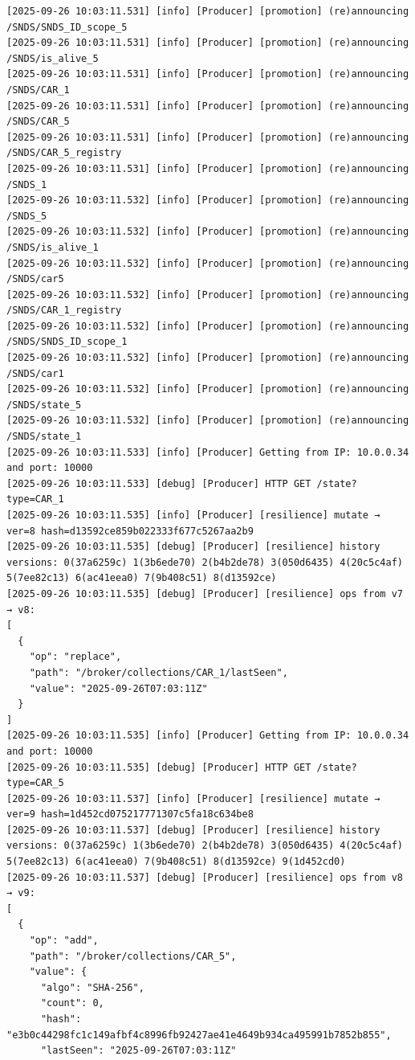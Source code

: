 \documentclass{article}
\begin{document}
\begin{lstlisting}[language=log, caption={Logs of Node F after providing the data of Node B}, label={lst:f-becoming-primary}]
[2025-09-26 10:03:11.531] [info] [Producer] [promotion] (re)announcing /SNDS/SNDS_ID_scope_5
[2025-09-26 10:03:11.531] [info] [Producer] [promotion] (re)announcing /SNDS/is_alive_5
[2025-09-26 10:03:11.531] [info] [Producer] [promotion] (re)announcing /SNDS/CAR_1
[2025-09-26 10:03:11.531] [info] [Producer] [promotion] (re)announcing /SNDS/CAR_5
[2025-09-26 10:03:11.531] [info] [Producer] [promotion] (re)announcing /SNDS/CAR_5_registry
[2025-09-26 10:03:11.531] [info] [Producer] [promotion] (re)announcing /SNDS_1
[2025-09-26 10:03:11.532] [info] [Producer] [promotion] (re)announcing /SNDS_5
[2025-09-26 10:03:11.532] [info] [Producer] [promotion] (re)announcing /SNDS/is_alive_1
[2025-09-26 10:03:11.532] [info] [Producer] [promotion] (re)announcing /SNDS/car5
[2025-09-26 10:03:11.532] [info] [Producer] [promotion] (re)announcing /SNDS/CAR_1_registry
[2025-09-26 10:03:11.532] [info] [Producer] [promotion] (re)announcing /SNDS/SNDS_ID_scope_1
[2025-09-26 10:03:11.532] [info] [Producer] [promotion] (re)announcing /SNDS/car1
[2025-09-26 10:03:11.532] [info] [Producer] [promotion] (re)announcing /SNDS/state_5
[2025-09-26 10:03:11.532] [info] [Producer] [promotion] (re)announcing /SNDS/state_1
[2025-09-26 10:03:11.533] [info] [Producer] Getting from IP: 10.0.0.34 and port: 10000
[2025-09-26 10:03:11.533] [debug] [Producer] HTTP GET /state?type=CAR_1
[2025-09-26 10:03:11.535] [info] [Producer] [resilience] mutate → ver=8 hash=d13592ce859b022333f677c5267aa2b9
[2025-09-26 10:03:11.535] [debug] [Producer] [resilience] history versions: 0(37a6259c) 1(3b6ede70) 2(b4b2de78) 3(050d6435) 4(20c5c4af) 5(7ee82c13) 6(ac41eea0) 7(9b408c51) 8(d13592ce) 
[2025-09-26 10:03:11.535] [debug] [Producer] [resilience] ops from v7 → v8:
[
  {
    "op": "replace",
    "path": "/broker/collections/CAR_1/lastSeen",
    "value": "2025-09-26T07:03:11Z"
  }
]
[2025-09-26 10:03:11.535] [info] [Producer] Getting from IP: 10.0.0.34 and port: 10000
[2025-09-26 10:03:11.535] [debug] [Producer] HTTP GET /state?type=CAR_5
[2025-09-26 10:03:11.537] [info] [Producer] [resilience] mutate → ver=9 hash=1d452cd075217771307c5fa18c634be8
[2025-09-26 10:03:11.537] [debug] [Producer] [resilience] history versions: 0(37a6259c) 1(3b6ede70) 2(b4b2de78) 3(050d6435) 4(20c5c4af) 5(7ee82c13) 6(ac41eea0) 7(9b408c51) 8(d13592ce) 9(1d452cd0) 
[2025-09-26 10:03:11.537] [debug] [Producer] [resilience] ops from v8 → v9:
[
  {
    "op": "add",
    "path": "/broker/collections/CAR_5",
    "value": {
      "algo": "SHA-256",
      "count": 0,
      "hash": "e3b0c44298fc1c149afbf4c8996fb92427ae41e4649b934ca495991b7852b855",
      "lastSeen": "2025-09-26T07:03:11Z"

\end{lstlisting}
\end{document}
